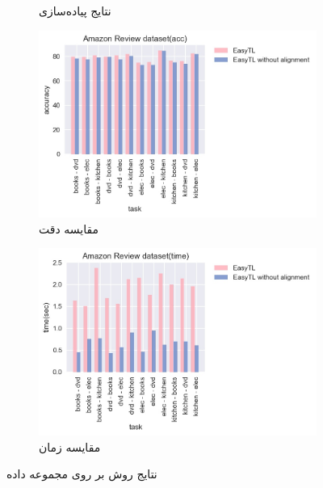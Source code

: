 \begin{figure}[H]
\begin{subfigure}[b]{0.2\textwidth}
		\caption{نتایج پیاده‌سازی }
	\end{subfigure}%
	\begin{subfigure}[b]{0.3\textwidth}
		\centering
		\includegraphics[width=\linewidth]{images/1_2.jpg}
		\caption{مقایسه دقت}
	\end{subfigure}%
	\begin{subfigure}[b]{0.3\textwidth}
		\centering
		\includegraphics[width=\linewidth]{images/1_3.jpg}
		\caption{مقایسه زمان}
	\end{subfigure}%
	\caption{
		نتایج روش
		 بر روی مجموعه داده
	}
	\label{fig:1}
\end{figure}

